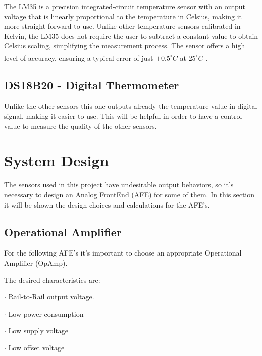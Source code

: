 \documentclass[12pt]{article}
\begin{document}
    The LM35 is a precision integrated-circuit temperature sensor with an output voltage that is linearly proportional to the temperature in Celsius, making it more straight forward to use. Unlike other temperature sensors calibrated in Kelvin, the LM35 does not require the user to subtract a constant value to obtain Celsius scaling, simplifying the measurement process. The sensor offers a high level of accuracy, ensuring a typical error of just $\pm 0.5^\circ C$ at $25^\circ C$ \textsuperscript{\cite{LM35_datasheet}} .

\subsection{DS18B20 - Digital Thermometer}

    Unlike the other sensors this one outputs already the temperature value in digital signal, making it easier to use. This will be helpful in order to have a control value to measure the quality of the other sensors.

\newpage
\section{System Design}

    The sensors used in this project have undesirable output behaviors, so it's necessary to design an Analog FrontEnd (AFE) for some of them. In this section it will be shown the design choices and calculations for the AFE's.

\subsection{Operational Amplifier}
          
    For the following AFE's it's important to choose an appropriate Operational Amplifier (OpAmp). 

    The desired characteristics are:

    $\cdot$ Rail-to-Rail output voltage.
    
    $\cdot$ Low power consumption
    
    $\cdot$ Low supply voltage

    $\cdot$ Low offset voltage
\end{document}
